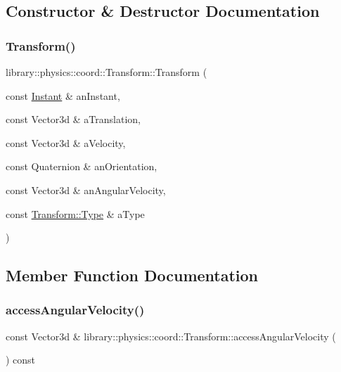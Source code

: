 \subsection{Constructor \& Destructor Documentation}
\mbox{\label{classlibrary_1_1physics_1_1coord_1_1_transform_ac4b91f8f159f3319174e091cf6103cf9}} 
\subsubsection{\texorpdfstring{Transform()}{Transform()}}
{\footnotesize\ttfamily library\+::physics\+::coord\+::\+Transform\+::\+Transform (\begin{DoxyParamCaption}\item[{const \hyperlink{classlibrary_1_1physics_1_1time_1_1_instant}{Instant} \&}]{an\+Instant,  }\item[{const Vector3d \&}]{a\+Translation,  }\item[{const Vector3d \&}]{a\+Velocity,  }\item[{const Quaternion \&}]{an\+Orientation,  }\item[{const Vector3d \&}]{an\+Angular\+Velocity,  }\item[{const \hyperlink{classlibrary_1_1physics_1_1coord_1_1_transform_a4f19d7d232ce1fda0dcee16e4157db2c}{Transform\+::\+Type} \&}]{a\+Type }\end{DoxyParamCaption})}



\subsection{Member Function Documentation}
\mbox{\label{classlibrary_1_1physics_1_1coord_1_1_transform_a0e7dc9e3c40a5e3b836ccb10e250d207}} 
\subsubsection{\texorpdfstring{access\+Angular\+Velocity()}{accessAngularVelocity()}}
{\footnotesize\ttfamily const Vector3d \& library\+::physics\+::coord\+::\+Transform\+::access\+Angular\+Velocity (\begin{DoxyParamCaption}{ }\end{DoxyParamCaption}) const}

